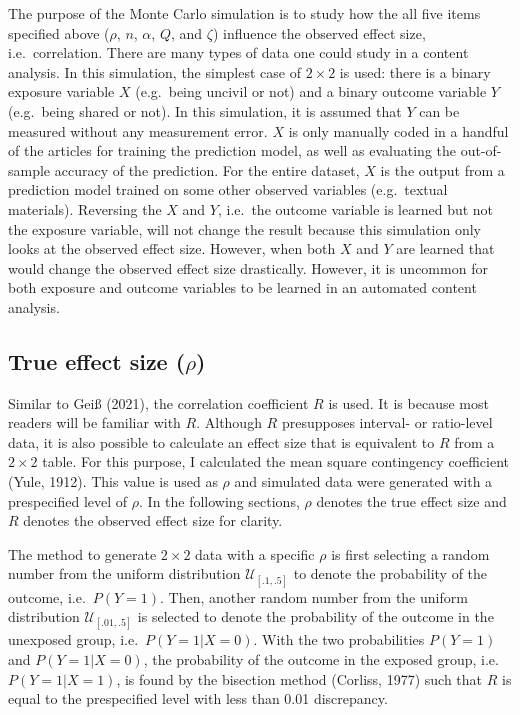 \documentclass[english,man,floatsintext]{apa6}
\begin{document}
The purpose of the Monte Carlo simulation is to study how the all five items specified above (\(\rho\), \(n\), \(\alpha\), \(Q\), and \(\zeta\)) influence the observed effect size, i.e.~correlation. There are many types of data one could study in a content analysis. In this simulation, the simplest case of \(2 \times 2\) is used: there is a binary exposure variable \(X\) (e.g.~being uncivil or not) and a binary outcome variable \(Y\) (e.g.~being shared or not). In this simulation, it is assumed that \(Y\) can be measured without any measurement error. \(X\) is only manually coded in a handful of the articles for training the prediction model, as well as evaluating the out-of-sample accuracy of the prediction. For the entire dataset, \(X\) is the output from a prediction model trained on some other observed variables (e.g.~textual materials). Reversing the \(X\) and \(Y\), i.e.~the outcome variable is learned but not the exposure variable, will not change the result because this simulation only looks at the observed effect size. However, when both \(X\) and \(Y\) are learned that would change the observed effect size drastically. However, it is uncommon for both exposure and outcome variables to be learned in an automated content analysis.

\hypertarget{true-effect-size-rho}{%
\subsection{\texorpdfstring{True effect size (\(\rho\))}{True effect size (\textbackslash{}rho)}}\label{true-effect-size-rho}}

Similar to Geiß (2021), the correlation coefficient \(R\) is used. It is because most readers will be familiar with \(R\). Although \(R\) presupposes interval- or ratio-level data, it is also possible to calculate an effect size that is equivalent to \(R\) from a \(2 \times 2\) table. For this purpose, I calculated the mean square contingency coefficient (Yule, 1912). This value is used as \(\rho\) and simulated data were generated with a prespecified level of \(\rho\). In the following sections, \(\rho\) denotes the true effect size and \(R\) denotes the observed effect size for clarity.

The method to generate \(2 \times 2\) data with a specific \(\rho\) is first selecting a random number from the uniform distribution \(\mathcal{U}_{[.1, .5]}\) to denote the probability of the outcome, i.e.~\(P(Y=1)\). Then, another random number from the uniform distribution \(\mathcal{U}_{[.01, .5]}\) is selected to denote the probability of the outcome in the unexposed group, i.e.~\(P(Y=1|X=0)\). With the two probabilities \(P(Y=1)\) and \(P(Y=1|X=0)\), the probability of the outcome in the exposed group, i.e.~\(P(Y=1|X=1)\), is found by the bisection method (Corliss, 1977) such that \(R\) is equal to the prespecified level with less than 0.01 discrepancy.
\end{document}
